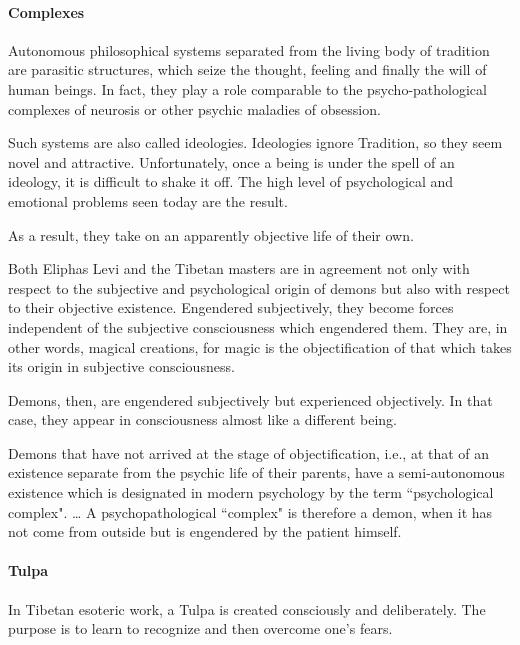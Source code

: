 \paragraph{Complexes}
\begin{quotex}
Autonomous philosophical systems separated from the living body of tradition are parasitic structures, which seize the thought, feeling and finally the will of human beings. In fact, they play a role comparable to the psycho-pathological complexes of neurosis or other psychic maladies of obsession.

\end{quotex}
Such systems are also called ideologies. Ideologies ignore Tradition, so they seem novel and attractive. Unfortunately, once a being is under the spell of an ideology, it is difficult to shake it off. The high level of psychological and emotional problems seen today are the result.

As a result, they take on an apparently objective life of their own.

\begin{quotex}
Both Eliphas Levi and the Tibetan masters are in agreement not only with respect to the subjective and psychological origin of demons but also with respect to their objective existence. Engendered subjectively, they become forces independent of the subjective consciousness which engendered them. They are, in other words, magical creations, for magic is the objectification of that which takes its origin in subjective consciousness. 

\end{quotex}
Demons, then, are engendered subjectively but experienced objectively. In that case, they appear in consciousness almost like a different being.

\begin{quotex}
Demons that have not arrived at the stage of objectification, i.e., at that of an existence separate from the psychic life of their parents, have a semi-autonomous existence which is designated in modern psychology by the term ``psychological complex". … A psychopathological ``complex" is therefore a demon, when it has not come from outside but is engendered by the patient himself.

\end{quotex}
\paragraph{Tulpa}
In Tibetan esoteric work, a Tulpa is created consciously and deliberately. The purpose is to learn to recognize and then overcome one's fears.

